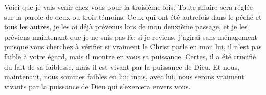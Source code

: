 Voici que je vais venir chez vous pour la troisième fois.
	Toute affaire sera réglée sur la parole de deux ou trois témoins.
Ceux qui ont été autrefois dans le péché et tous les autres,
	je les ai déjà prévenus lors de mon deuxième passage,
	et je les préviens maintenant que je ne suis pas là:
	si je reviens, j’agirai sans ménagement
	puisque vous cherchez à vérifier si vraiment le Christ parle en moi;
	lui, il n’est pas faible à votre égard, mais il montre en vous sa puissance.
Certes, il a été crucifié du fait de sa faiblesse,
	mais il est vivant par la puissance de Dieu.
Et nous, maintenant, nous sommes faibles en lui;
	mais, avec lui, nous serons vraiment vivants
	par la puissance de Dieu qui s’exercera envers vous.
